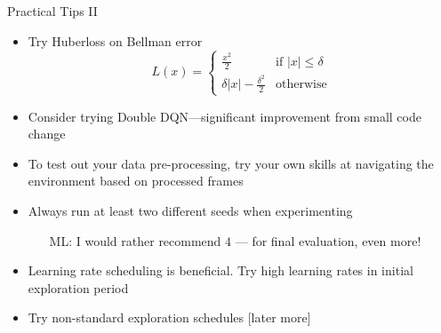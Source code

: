 \begin{frame}[c]{Practical Tips II}
	
	\begin{itemize}
		\item Try Huberloss on Bellman error
		$$L(x) =  \begin{cases}
		\frac{x^2}{2} & \text{if } |x| \leq \delta\\
		\delta |x| - \frac{\delta^2}{2} & \text{otherwise}
		\end{cases}
		$$
		\item Consider trying Double DQN—significant improvement from small
		code change 
		\item To test out your data pre-processing, try your own skills at navigating
		the environment based on processed frames
		\item Always run at least two different seeds when experimenting
		\begin{itemize}
			\item [ML:] I would rather recommend $4$ --- for final evaluation, even more!
		\end{itemize}
		\item Learning rate scheduling is beneficial. Try high learning rates in initial
		exploration period
		\item Try non-standard exploration schedules [later more]
	\end{itemize}
	
\end{frame}

